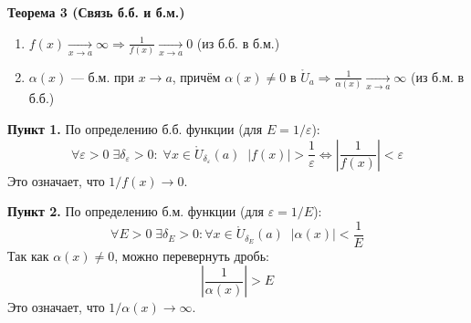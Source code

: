 \textbf{Теорема 3 (Связь б.б. и б.м.)}
\begin{enumerate}
	\item $f(x) \xrightarrow[x\to a]{} \infty \Rightarrow \frac{1}{f(x)} \xrightarrow[x \to a]{} 0$ (из б.б. в б.м.)
	\item $\alpha(x)$ — б.м. при $x \to a$, причём $\alpha(x) \neq 0$ в $\mathring{U}_a \Rightarrow \frac{1}{\alpha(x)} \xrightarrow[x\to a]{} \infty$ (из б.м. в б.б.)
\end{enumerate}

\begin{tcolorbox}[title=Доказательство]
	\textbf{Пункт 1.}
	По определению б.б. функции (для $E = 1/\varepsilon$):
	\[ \forall \varepsilon > 0 \; \exists \delta_\varepsilon > 0: \; \forall x \in \mathring{U}_{\delta_\varepsilon}(a) \;\; |f(x)| > \frac{1}{\varepsilon} \Leftrightarrow \left|\frac{1}{f(x)}\right| < \varepsilon \]
	Это означает, что $1/f(x) \to 0$.

	\textbf{Пункт 2.}
	По определению б.м. функции (для $\varepsilon = 1/E$):
	\[ \forall E > 0\; \exists \delta_E > 0: \forall x \in \mathring{U}_{\delta_E}(a) \;\; |\alpha(x)| < \frac{1}{E} \]
	Так как $\alpha(x) \neq 0$, можно перевернуть дробь:
	\[ \left|\frac{1}{\alpha(x)}\right| > E \]
	Это означает, что $1/\alpha(x) \to \infty$.
\end{tcolorbox}
